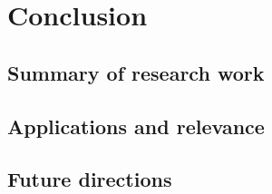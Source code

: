 \chapter{Conclusion}

\section{Summary of research work}

\section{Applications and relevance}

\section{Future directions}